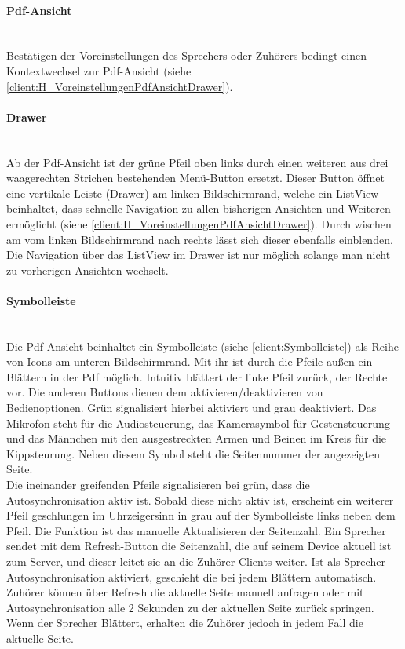 \paragraph{Pdf-Ansicht}$\;$\\
Bestätigen der Voreinstellungen des Sprechers oder Zuhörers bedingt einen Kontextwechsel zur Pdf-Ansicht (siehe \autoref{client:H_VoreinstellungenPdfAnsichtDrawer}).
\paragraph{Drawer}$\;$\\
Ab der Pdf-Ansicht ist der grüne Pfeil oben links durch einen weiteren aus drei waagerechten Strichen bestehenden Menü-Button ersetzt. Dieser Button öffnet eine vertikale Leiste (Drawer) am linken Bildschirmrand, welche ein ListView beinhaltet, dass schnelle Navigation zu allen bisherigen Ansichten und Weiteren ermöglicht (siehe \autoref{client:H_VoreinstellungenPdfAnsichtDrawer}). Durch wischen am vom linken Bildschirmrand nach rechts lässt sich dieser ebenfalls einblenden. Die Navigation über das ListView im Drawer ist nur möglich solange man nicht zu vorherigen Ansichten wechselt. 
\paragraph{Symbolleiste}$\;$\\
Die Pdf-Ansicht beinhaltet ein Symbolleiste (siehe \autoref{client:Symbolleiste}) als Reihe von Icons am unteren Bildschirmrand. Mit ihr ist durch die Pfeile außen ein Blättern in der Pdf möglich. Intuitiv blättert der linke Pfeil zurück, der Rechte vor. Die anderen Buttons dienen dem aktivieren/deaktivieren von Bedienoptionen. Grün signalisiert hierbei aktiviert und grau deaktiviert. Das Mikrofon steht für die Audiosteuerung, das Kamerasymbol für  Gestensteuerung und das Männchen mit den ausgestreckten Armen und Beinen im Kreis für die Kippsteurung. Neben diesem Symbol steht die Seitennummer der angezeigten Seite.
\\Die ineinander greifenden Pfeile signalisieren bei grün, dass die Autosynchronisation aktiv ist. Sobald diese nicht aktiv ist, erscheint ein weiterer Pfeil geschlungen im Uhrzeigersinn in grau auf der Symbolleiste links neben dem Pfeil. Die Funktion ist das manuelle Aktualisieren der Seitenzahl. Ein Sprecher sendet mit dem Refresh-Button die Seitenzahl, die auf seinem Device aktuell ist zum Server, und dieser leitet sie an die Zuhörer-Clients weiter. Ist als Sprecher Autosynchronisation aktiviert, geschieht die bei jedem Blättern automatisch. Zuhörer können über Refresh die aktuelle Seite manuell anfragen oder mit Autosynchronisation alle 2 Sekunden zu der aktuellen Seite zurück springen. Wenn der Sprecher Blättert, erhalten die Zuhörer jedoch in jedem Fall die aktuelle Seite.

